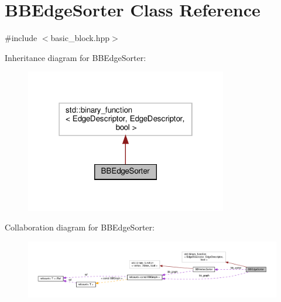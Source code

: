 \hypertarget{classBBEdgeSorter}{}\section{B\+B\+Edge\+Sorter Class Reference}
\label{classBBEdgeSorter}


{\ttfamily \#include $<$basic\+\_\+block.\+hpp$>$}



Inheritance diagram for B\+B\+Edge\+Sorter\+:
\nopagebreak
\begin{figure}[H]
\begin{center}
\leavevmode
\includegraphics[width=250pt]{db/dc6/classBBEdgeSorter__inherit__graph}
\end{center}
\end{figure}


Collaboration diagram for B\+B\+Edge\+Sorter\+:
\nopagebreak
\begin{figure}[H]
\begin{center}
\leavevmode
\includegraphics[width=350pt]{dd/dc6/classBBEdgeSorter__coll__graph}
\end{center}
\end{figure}
